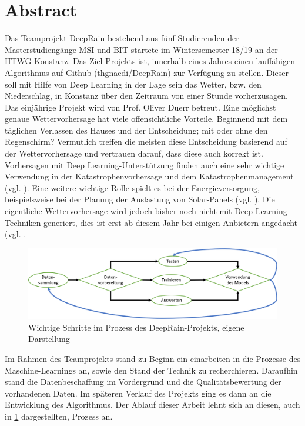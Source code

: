 \section{Abstract}
Das Teamprojekt DeepRain bestehend aus fünf Studierenden der Masterstudiengänge MSI und BIT startete im Wintersemester 18/19 an der HTWG Konstanz. Das Ziel Projekts ist, innerhalb eines Jahres einen lauffähigen Algorithmus auf Github (thgnaedi/DeepRain) zur Verfügung zu stellen. Dieser soll mit Hilfe von Deep Learning in der Lage sein das Wetter, bzw. den Niederschlag, in Konstanz über den Zeitraum von einer Stunde vorherzusagen. Das einjährige Projekt wird von Prof. Oliver Duerr betreut. 
Eine möglichst genaue Wettervorhersage hat viele offensichtliche Vorteile. Beginnend mit dem täglichen Verlassen des Hauses und der Entscheidung; mit oder ohne den Regenschirm? Vermutlich treffen die meisten diese Entscheidung basierend auf der Wettervorhersage und vertrauen darauf, dass diese auch korrekt ist.
Vorhersagen mit Deep Learning-Unterstützung finden auch eine sehr wichtige Verwendung in der Katastrophenvorhersage und dem Katastrophenmanagement (vgl. \cite[S. 763]{Hanif.2019}). Eine weitere wichtige Rolle spielt es bei der Energieversorgung, beispielsweise bei der Planung der Auslastung von Solar-Panels (vgl. \cite[S. 2]{AndreGensleret.al..}). Die eigentliche Wettervorhersage wird jedoch bisher noch nicht mit Deep Learning-Techniken generiert, dies ist erst ab diesem Jahr bei einigen Anbietern angedacht (vgl. \cite{ChristophFrohlich.2019}. 
\begin{figure}[ht]
\centering
\includegraphics[width=\linewidth]{pics/Deep_learning_prozess}
\caption{Wichtige Schritte im Prozess des DeepRain-Projekts, eigene Darstellung}
\label{fig:deepLearningProcess}
\end{figure}
Im Rahmen des Teamprojekts stand zu Beginn ein einarbeiten in die Prozesse des Maschine-Learnings an, sowie den Stand der Technik zu recherchieren. Daraufhin stand die Datenbeschaffung im Vordergrund und die Qualitätsbewertung der vorhandenen Daten. Im späteren Verlauf des Projekts ging es dann an die Entwicklung des Algorithmus. Der Ablauf dieser Arbeit lehnt sich an diesen, auch in \ref{fig:deepLearningProcess} dargestellten, Prozess an. 

